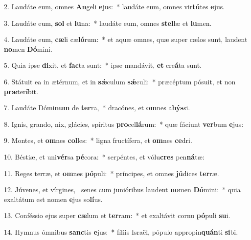 2. Laudáte eum, omnes \textbf{An}geli \textbf{e}jus:~*  laudáte eum, omnes vir\textbf{tú}tes \textbf{e}jus.\

3. Laudáte eum, \textbf{sol} et \textbf{lu}na:~*  laudáte eum, omnes \textbf{stel}læ et \textbf{lu}men.\

4. Laudáte eum, \textbf{cæ}li cæ\textbf{ló}rum:~*  et aquæ omnes, quæ super cælos sunt, laudent \textbf{no}men \textbf{Dó}mini.\

5. Quia ipse \textbf{di}xit, et \textbf{fac}ta sunt:~*  ipse mandávit, \textbf{et} cre\textbf{á}ta sunt.\

6. Státuit ea in ætérnum, et in \textbf{sǽ}culum \textbf{sǽ}culi:~*  præcéptum pósuit, et non \textbf{præ}ter\textbf{í}bit.\

7. Laudáte Dómi\textbf{num} de \textbf{ter}ra,~*  dracónes, et \textbf{om}nes a\textbf{býs}si.\

8. Ignis, grando, nix, glácies, spíritus \textbf{pro}cel\textbf{lá}rum:~*  quæ fáciunt \textbf{ver}bum \textbf{e}jus:\

9. Montes, et \textbf{om}nes \textbf{col}les:~*  ligna fructífera, et \textbf{om}nes \textbf{ce}dri.\

10. Béstiæ, et uni\textbf{vér}sa \textbf{pé}cora:~*  serpéntes, et vólu\textbf{cres} pen\textbf{ná}tæ:\

11. Reges terræ, et \textbf{om}nes \textbf{pó}puli:~*  príncipes, et omnes \textbf{jú}dices \textbf{ter}ræ.\

12. Júvenes, et vírgines, \dag\  senes cum junióribus laudent \textbf{no}men \textbf{Dó}mini:~*  quia exaltátum est nomen \textbf{e}jus so\textbf{lí}us.\

13. Conféssio ejus super \textbf{cæ}lum et \textbf{ter}ram:~*  et exaltávit cornu \textbf{pó}puli \textbf{su}i.\

14. Hymnus ómnibus \textbf{sanc}tis \textbf{e}jus:~*  fíliis Israël, pópulo appropin\textbf{quán}ti \textbf{si}bi.\

